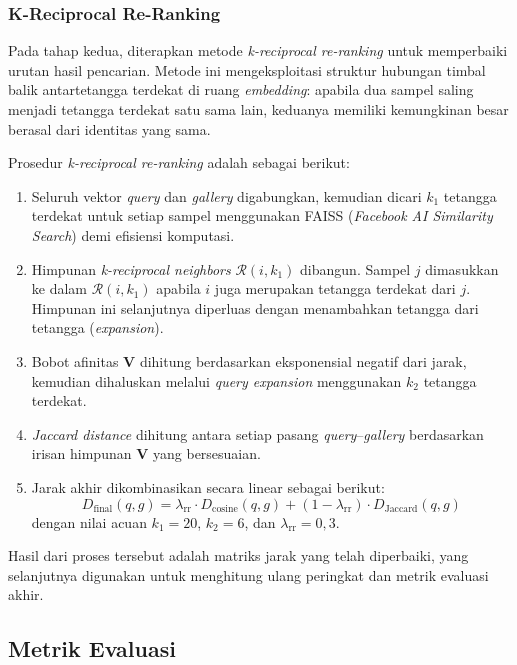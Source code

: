 \subsubsection{K-Reciprocal Re-Ranking}

Pada tahap kedua, diterapkan metode \textit{k-reciprocal re-ranking} untuk memperbaiki urutan hasil pencarian. Metode ini mengeksploitasi struktur hubungan timbal balik antartetangga terdekat di ruang \textit{embedding}: apabila dua sampel saling menjadi tetangga terdekat satu sama lain, keduanya memiliki kemungkinan besar berasal dari identitas yang sama.

Prosedur \textit{k-reciprocal re-ranking} adalah sebagai berikut:
\begin{enumerate}
    \item Seluruh vektor \textit{query} dan \textit{gallery} digabungkan, kemudian dicari $k_1$ tetangga terdekat untuk setiap sampel menggunakan FAISS (\textit{Facebook AI Similarity Search}) demi efisiensi komputasi.
    \item Himpunan \textit{k-reciprocal neighbors} $\mathcal{R}(i, k_1)$ dibangun. Sampel $j$ dimasukkan ke dalam $\mathcal{R}(i, k_1)$ apabila $i$ juga merupakan tetangga terdekat dari $j$. Himpunan ini selanjutnya diperluas dengan menambahkan tetangga dari tetangga (\textit{expansion}).
    \item Bobot afinitas $\mathbf{V}$ dihitung berdasarkan eksponensial negatif dari jarak, kemudian dihaluskan melalui \textit{query expansion} menggunakan $k_2$ tetangga terdekat.
    \item \textit{Jaccard distance} dihitung antara setiap pasang \textit{query}--\textit{gallery} berdasarkan irisan himpunan $\mathbf{V}$ yang bersesuaian.
    \item Jarak akhir dikombinasikan secara linear sebagai berikut:
    \begin{equation}
        D_{\text{final}}(q, g) = \lambda_{\text{rr}} \cdot D_{\text{cosine}}(q, g) + (1 - \lambda_{\text{rr}}) \cdot D_{\text{Jaccard}}(q, g)
    \end{equation}
    dengan nilai acuan $k_1 = 20$, $k_2 = 6$, dan $\lambda_{\text{rr}} = 0{,}3$.
\end{enumerate}

Hasil dari proses tersebut adalah matriks jarak yang telah diperbaiki, yang selanjutnya digunakan untuk menghitung ulang peringkat dan metrik evaluasi akhir.

\subsection{Metrik Evaluasi}

